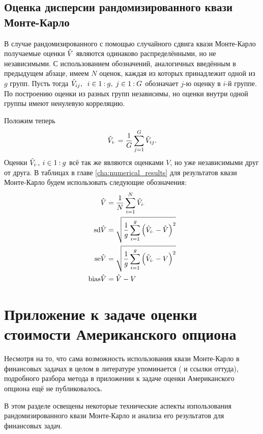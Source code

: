 \subsection{Оценка дисперсии рандомизированного квази Монте-Карло} %
\label{ssub:qmc:randomization:variance_estimation}

В случае рандомизированного с помощью случайного сдвига квази Монте-Карло получаемые оценки $\hat{V}$ являются одинаково распределёнными, но не независимыми. С использованием обозначений, аналогичных введённым в предыдущем абзаце, имеем $N$ оценок, каждая из которых принадлежит одной из $g$ групп. Пусть тогда $\hat{V}_{ij},\;\;i\in{1\mathbin{:}g},\;j \in{1\mathbin{:}G}$ обозначает $j$-ю оценку в $i$-й группе. По построению оценки из разных групп независимы, но оценки внутри одной группы имеют ненулевую корреляцию. 

Положим теперь 
$$\hat{V}_{i\cdot} = \frac{1}{G}\sum_{j=1}^G \hat{V}_{ij}.$$
Оценки $\hat{V}_{i\cdot},\:i\in{1\mathbin{:}g}$ всё так же являются оценками $V$, но уже независимыми друг от друга. В таблицах в главе \ref{cha:numerical_results} для результатов квази Монте-Карло будем использовать следующие обозначения:
\begin{equation}
\begin{aligned}
    \hat{V} &= \frac{1}{N}\sum_{i=1}^N \hat{V}_{i\cdot} \\
    \mathrm{sd}\hat{V} &= \sqrt{\frac{1}{g}\sum_{i=1}^g \left(\hat{V}_{i\cdot} - \hat{V}\right)^2} \\
    \mathrm{se}\hat{V} &= \sqrt{\frac{1}{g}\sum_{i=1}^g \left(\hat{V}_{i\cdot} - V\right)^2} \\
    \mathrm{bias}\hat{V} &= \hat{V} - V
\end{aligned}
\end{equation}


\section{Приложение к задаче оценки стоимости Американского опциона} %
\label{sec:qmc:monte_carlo_in_option_pricing}

Несмотря на то, что сама возможность использования квази Монте-Карло в финансовых задачах в целом в литературе упоминается (\cite[глава~5]{Glasserman2004} и ссылки оттуда), подробного разбора метода в приложении к задаче оценки Американского опциона ещё не публиковалось.

В этом разделе освещены некоторые технические аспекты изпользования рандомизированного квази Монте-Карло и анализа его результатов для финансовых задач. %

